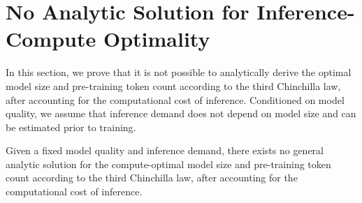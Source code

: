 \section{No Analytic Solution for Inference-Compute Optimality} \label{sec:proof1}
In this section, we prove that it is not possible to analytically derive the optimal model size and pre-training token count according to the third Chinchilla law, after accounting for the computational cost of inference. Conditioned on model quality, we assume that inference demand does not depend on model size and can be estimated prior to training.

\begin{theorem}
\label{noanalytic}
Given a fixed model quality and inference demand, there exists no general analytic solution for the compute-optimal model size and pre-training token count according to the third Chinchilla law, after accounting for the computational cost of inference. 
\end{theorem}
